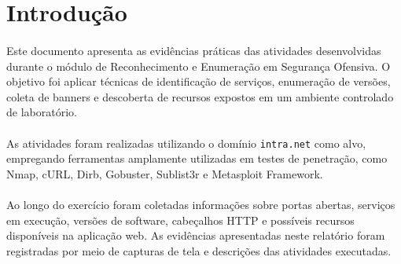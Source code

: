 \section{Introdução}

\paragraph{}
Este documento apresenta as evidências práticas das atividades desenvolvidas
durante o módulo de Reconhecimento e Enumeração em Segurança Ofensiva. O
objetivo foi aplicar técnicas de identificação de serviços, enumeração de
versões, coleta de banners e descoberta de recursos expostos em um ambiente
controlado de laboratório.

\paragraph{}
As atividades foram realizadas utilizando o domínio \texttt{intra.net} como
alvo, empregando ferramentas amplamente utilizadas em testes de penetração,
como Nmap, cURL, Dirb, Gobuster, Sublist3r e Metasploit Framework.

\paragraph{}
Ao longo do exercício foram coletadas informações sobre portas abertas,
serviços em execução, versões de software, cabeçalhos HTTP e possíveis recursos
disponíveis na aplicação web. As evidências apresentadas neste relatório foram
registradas por meio de capturas de tela e descrições das atividades
executadas.
